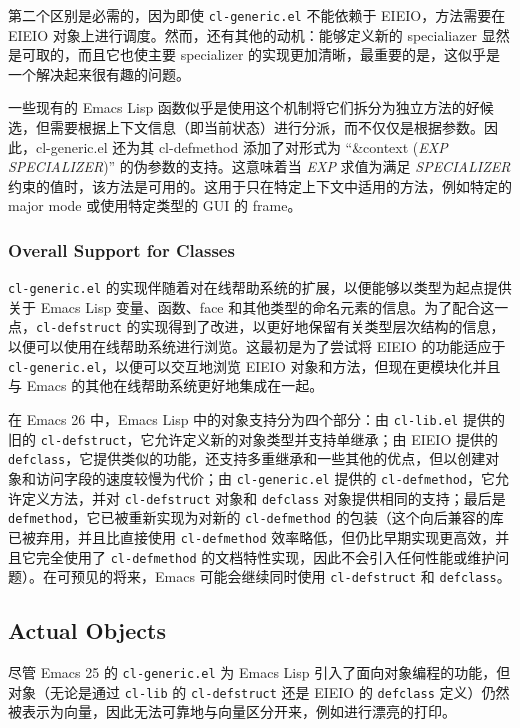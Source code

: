\documentclass[format=acmsmall,screen]{acmart}
\newcommand \id[1] {\textrm{\textsl{#1}}}
\begin{document}
第二个区别是必需的，因为即使 \texttt{cl-generic.el} 不能依赖于 EIEIO，方法需要在 EIEIO 对象上进行调度。然而，还有其他的动机：能够定义新的 specialiazer 显然是可取的，而且它也使主要 specializer 的实现更加清晰，最重要的是，这似乎是一个解决起来很有趣的问题。

一些现有的 Emacs Lisp 函数似乎是使用这个机制将它们拆分为独立方法的好候选，但需要根据上下文信息（即当前状态）进行分派，而不仅仅是根据参数。因此，cl-generic.el 还为其 cl-defmethod 添加了对形式为 ``\&context (\id{EXP} \id{SPECIALIZER})'' 的伪参数的支持。这意味着当 \id{EXP} 求值为满足 \id{SPECIALIZER} 约束的值时，该方法是可用的。这用于只在特定上下文中适用的方法，例如特定的 major mode 或使用特定类型的 GUI 的 frame。

\subsubsection{Overall Support for Classes}

\texttt{cl-generic.el} 的实现伴随着对在线帮助系统的扩展，以便能够以类型为起点提供关于 Emacs Lisp 变量、函数、face 和其他类型的命名元素的信息。为了配合这一点，\texttt{cl-defstruct} 的实现得到了改进，以更好地保留有关类型层次结构的信息，以便可以使用在线帮助系统进行浏览。这最初是为了尝试将 EIEIO 的功能适应于 \texttt{cl-generic.el}，以便可以交互地浏览 EIEIO 对象和方法，但现在更模块化并且与 Emacs 的其他在线帮助系统更好地集成在一起。

在 Emacs 26 中，Emacs Lisp 中的对象支持分为四个部分：由 \texttt{cl-lib.el} 提供的旧的 \texttt{cl-defstruct}，它允许定义新的对象类型并支持单继承；由 EIEIO 提供的 \texttt{defclass}，它提供类似的功能，还支持多重继承和一些其他的优点，但以创建对象和访问字段的速度较慢为代价；由 \texttt{cl-generic.el} 提供的 \texttt{cl-defmethod}，它允许定义方法，并对 \texttt{cl-defstruct} 对象和 \texttt{defclass} 对象提供相同的支持；最后是 \texttt{defmethod}，它已被重新实现为对新的 \texttt{cl-defmethod} 的包装（这个向后兼容的库已被弃用，并且比直接使用 \texttt{cl-defmethod} 效率略低，但仍比早期实现更高效，并且它完全使用了 \texttt{cl-defmethod} 的文档特性实现，因此不会引入任何性能或维护问题）。在可预见的将来，Emacs 可能会继续同时使用 \texttt{cl-defstruct} 和 \texttt{defclass}。

\subsection{Actual Objects}  %
\label{sec:actual-objects}

尽管 Emacs 25 的 \texttt{cl-generic.el} 为 Emacs Lisp 引入了面向对象编程的功能，但对象（无论是通过 \texttt{cl-lib} 的 \texttt{cl-defstruct} 还是 EIEIO 的 \texttt{defclass} 定义）仍然被表示为向量，因此无法可靠地与向量区分开来，例如进行漂亮的打印。
\end{document}
